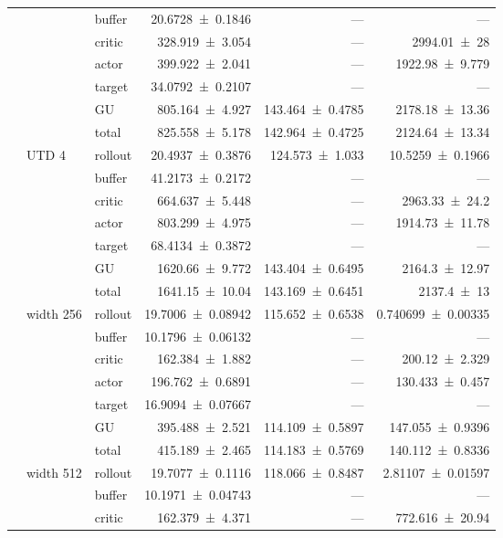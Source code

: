 {\begin{longtable}{@{}lllrrr@{}}
     &  & buffer & \num{20.6728+-0.1846} & --- & --- \\
     &  & critic & \num{328.919+-3.054} & --- & \num{2994.01+-28} \\
     &  & actor & \num{399.922+-2.041} & --- & \num{1922.98+-9.779} \\
     &  & target & \num{34.0792+-0.2107} & --- & --- \\
     &  & GU & \num{805.164+-4.927} & \num{143.464+-0.4785} & \num{2178.18+-13.36} \\
     &  & total & \num{825.558+-5.178} & \num{142.964+-0.4725} & \num{2124.64+-13.34} \\
    \addlinespace[2pt]
     & UTD 4 & rollout & \num{20.4937+-0.3876} & \num{124.573+-1.033} & \num{10.5259+-0.1966} \\
     &  & buffer & \num{41.2173+-0.2172} & --- & --- \\
     &  & critic & \num{664.637+-5.448} & --- & \num{2963.33+-24.2} \\
     &  & actor & \num{803.299+-4.975} & --- & \num{1914.73+-11.78} \\
     &  & target & \num{68.4134+-0.3872} & --- & --- \\
     &  & GU & \num{1620.66+-9.772} & \num{143.404+-0.6495} & \num{2164.3+-12.97} \\
     &  & total & \num{1641.15+-10.04} & \num{143.169+-0.6451} & \num{2137.4+-13} \\
    \addlinespace[2pt]
     & width 256 & rollout & \num{19.7006+-0.08942} & \num{115.652+-0.6538} & \num{0.740699+-0.00335} \\
     &  & buffer & \num{10.1796+-0.06132} & --- & --- \\
     &  & critic & \num{162.384+-1.882} & --- & \num{200.12+-2.329} \\
     &  & actor & \num{196.762+-0.6891} & --- & \num{130.433+-0.457} \\
     &  & target & \num{16.9094+-0.07667} & --- & --- \\
     &  & GU & \num{395.488+-2.521} & \num{114.109+-0.5897} & \num{147.055+-0.9396} \\
     &  & total & \num{415.189+-2.465} & \num{114.183+-0.5769} & \num{140.112+-0.8336} \\
    \addlinespace[2pt]
     & width 512 & rollout & \num{19.7077+-0.1116} & \num{118.066+-0.8487} & \num{2.81107+-0.01597} \\
     &  & buffer & \num{10.1971+-0.04743} & --- & --- \\
     &  & critic & \num{162.379+-4.371} & --- & \num{772.616+-20.94} \\

\end{longtable}}

